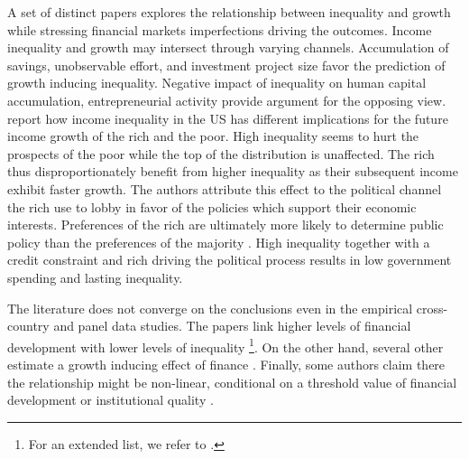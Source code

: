 \begin{refsection}
A set of distinct papers explores the relationship between inequality and growth while stressing financial markets imperfections driving the outcomes. Income inequality and growth may intersect through varying channels. Accumulation of savings, unobservable effort, and investment project size favor the prediction of growth inducing inequality. Negative impact of inequality on human capital accumulation, entrepreneurial activity provide argument for the opposing view. 
\textcite{van2018inequality} report how income inequality in the \ac{US} has different implications for the future income growth of the rich and the poor. High inequality seems to hurt the prospects of the poor while the top of the distribution is unaffected. The rich thus disproportionately benefit from higher inequality as their subsequent income exhibit faster growth. The authors attribute this effect to the political channel the rich use to lobby in favor of the policies which support their economic interests. Preferences of the rich are ultimately more likely to determine public policy than the preferences of the majority \parencite{gilens_page_2014}. High inequality together with a credit constraint and rich driving the political process results in low government spending and lasting inequality.

The literature does not converge on the conclusions even in the empirical cross-country and panel data studies. The papers link higher levels of financial development with lower levels of inequality \parencite{beck2007finance, hamori2012, gimet2011closer, kunieda2014finance}\footnote{For an extended list, we refer to \textcite{de2017finance}.}. On the other hand, several other estimate a growth inducing effect of finance \parencite{Jaumotte2013, jauch2016financial, de2017finance}. Finally, some authors claim there the relationship might be non-linear, conditional on a threshold value of financial development \parencite{kim2011nonlinearity,tan2012nonlinear} or institutional quality \parencite{LawSingh2014, delis2014}.


\end{refsection}
